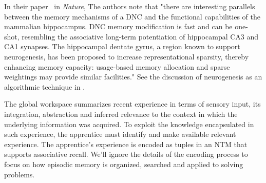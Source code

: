 In their paper~\cite{GravesetalNATURE-16} in {\it{Nature}}, The authors note that "there are interesting parallels between the memory mechanisms of a DNC and the functional capabilities of the mammalian hippocampus. DNC memory modification is fast and can be one-shot, resembling the associative long-term potentiation of hippocampal CA3 and CA1 synapses. The hippocampal dentate gyrus, a region known to support neurogenesis, has been proposed to increase representational sparsity, thereby enhancing memory capacity: usage-based memory allocation and sparse weightings may provide similar facilities." See the discussion of neurogenesis as an algorithmic technique in {}.

The global workspace summarizes recent experience in terms of sensory input, its integration, abstraction and inferred relevance to the context in which the underlying information was acquired. To exploit the knowledge encapsulated in such experience, the apprentice must identify and make available relevant experience. The apprentice's experience is encoded as tuples in an NTM that supports associative recall. We'll ignore the details of the encoding process to focus on how episodic memory is organized, searched and applied to solving problems.


